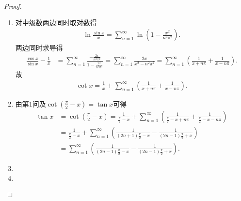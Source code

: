 \documentclass[../../main.tex]{subfiles}
\begin{document}
\begin{proof}
\begin{enumerate}
\item 对中级数两边同时取对数得
\begin{align*}
\ln \frac{\sin x}{x} = \sum_{n=1}^{\infty} \ln \left(1 - \frac{x^2}{n^2\pi^2}\right).
\end{align*}
两边同时求导得
\begin{align*}
\frac{\cos x}{\sin x} - \frac{1}{x} &= \sum_{n=1}^{\infty} \frac{-\frac{2x}{n^2\pi^2}}{1 - \frac{x^2}{n^2\pi^2}} = \sum_{n=1}^{\infty} \frac{2x}{x^2 - n^2\pi^2} = \sum_{n=1}^{\infty} \left( \frac{1}{x + n\pi} + \frac{1}{x - n\pi} \right).
\end{align*}
故
\begin{align*}
\cot x = \frac{1}{x} + \sum_{n=1}^{\infty} \left( \frac{1}{x + n\pi} + \frac{1}{x - n\pi} \right).
\end{align*}

\item 由第1问及$\cot \left( \frac{\pi}{2}-x \right) =\tan x$可得
\begin{align*}
\tan x&=\cot \left( \frac{\pi}{2}-x \right) =\frac{1}{\frac{\pi}{2}-x}+\sum_{n=1}^{\infty}{\left( \frac{1}{\frac{\pi}{2}-x+n\pi}+\frac{1}{\frac{\pi}{2}-x-n\pi} \right)}\\
&=\frac{1}{\frac{\pi}{2}-x}+\sum_{n=1}^{\infty}{\left( \frac{1}{\left( 2n+1 \right) \frac{\pi}{2}-x}-\frac{1}{\left( 2n-1 \right) \frac{\pi}{2}+x} \right)}\\
&=\sum_{n=1}^{\infty}{\left( \frac{1}{\left( 2n-1 \right) \frac{\pi}{2}-x}-\frac{1}{\left( 2n-1 \right) \frac{\pi}{2}+x} \right)}.
\end{align*}

\item 

\item 
\end{enumerate}
\end{proof}
\end{document}
